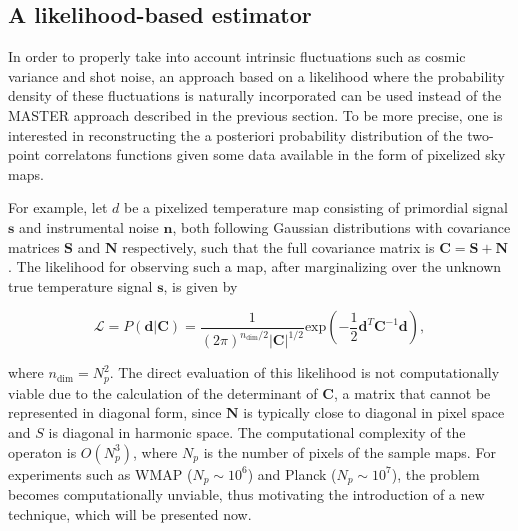 \documentclass[openany,a4paper,12pt,oneside]{book}
\begin{document}
\begin{spacing}{1.5}


\section{A likelihood-based estimator}

In order to properly take into account intrinsic fluctuations such as cosmic variance and shot noise, an approach based on a likelihood where the probability density of these fluctuations is naturally incorporated can be used instead of the MASTER approach described in the previous section. To be more precise, one is interested in reconstructing the a posteriori probability distribution of the two-point correlatons functions given some data available in the form of pixelized sky maps.


For example, let $d$ be a pixelized temperature map consisting of primordial signal $\mathbf{s}$ and instrumental noise $\mathbf{n}$, both following Gaussian distributions with covariance matrices $\mathbf{S}$ and $\mathbf{N}$ respectively, such that the full covariance matrix is $\mathbf{C}=\mathbf{S}+\mathbf{N}$. The likelihood for observing such a map, after marginalizing over the unknown true temperature signal $\mathbf{s}$, is given by

\begin{equation}\label{ch4:Likelihood}
	\mathcal{L}=P(\mathbf{d}|\mathbf{C})=\frac{1}{(2\pi)^{n_\text{dim}/2}|\mathbf{C}|^{1/2}}\text{exp}\left(-\frac{1}{2}\mathbf{d}^T \mathbf{C}^{-1} \mathbf{d}\right),
\end{equation}

\noindent where $n_\text{dim}=N_p^2$. The direct evaluation of this likelihood is not computationally viable due to the calculation of the determinant of $\mathbf{C}$, a matrix that cannot be represented in diagonal form, since $\mathbf{N}$ is typically close to diagonal in pixel space and $S$ is diagonal in harmonic space. The computational complexity of the operaton is $O(N_p^3)$, where $N_p$ is the number of pixels of the sample maps. For experiments such as WMAP ($N_p\sim 10^6$) and Planck ($N_p \sim 10^7$), the problem becomes computationally unviable, thus motivating the introduction of a new technique, which will be presented now.


\end{spacing}
\end{document}

